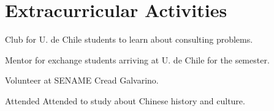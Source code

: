 \section{Extracurricular Activities \faStar}

Club for U. de Chile students to learn about consulting problems.
\sectionsep

Mentor for exchange students arriving at U. de Chile for the semester.
\sectionsep

Volunteer at SENAME Cread Galvarino.
\sectionsep

Attended Attended to study about Chinese history and culture.
\sectionsep